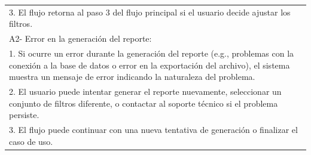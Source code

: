 \documentclass[stu, 12pt, letterpaper, donotrepeattitle, floatsintext, natbib]{apa7}
\begin{document}
\begin{longtable}{@{} p{16.5cm} @{}}
    \hspace{1cm}3. El flujo retorna al paso 3 del flujo principal si el usuario decide ajustar los filtros.                                                                                                                                                                      \\
    A2- Error en la generaci\'on del reporte:                                                                                                                                                                                                                                    \\
    \hspace{1cm}1. Si ocurre un error durante la generaci\'on del reporte (e.g., problemas con la conexi\'on a la base de datos o error en la exportaci\'on del archivo), el sistema muestra un mensaje de error indicando la naturaleza del problema.                           \\
    \hspace{1cm}2. El usuario puede intentar generar el reporte nuevamente, seleccionar un conjunto de filtros diferente, o contactar al soporte t\'ecnico si el problema persiste.                                                                                              \\
    \hspace{1cm}3. El flujo puede continuar con una nueva tentativa de generaci\'on o finalizar el caso de uso.                                                                                                                                                                  \\ \bottomrule
\end{longtable}
\newpage
\end{document}
